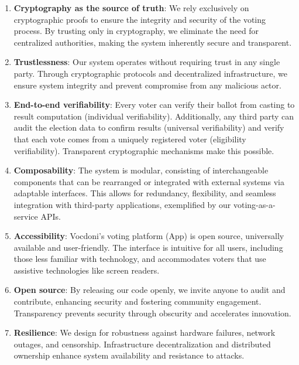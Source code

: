 \begin{enumerate}
	\item \textbf{Cryptography as the source of truth}: We rely exclusively on cryptographic proofs to ensure the integrity and security of the voting process. By trusting only in cryptography, we eliminate the need for centralized authorities, making the system inherently secure and transparent.
	
	\item \textbf{Trustlessness}: Our system operates without requiring trust in any single party. Through cryptographic protocols and decentralized infrastructure, we ensure system integrity and prevent compromise from any malicious actor.
	
	\item \textbf{End-to-end verifiability}: Every voter can verify their ballot from casting to result computation (individual verifiability). Additionally, any third party can audit the election data to confirm results (universal verifiability) and verify that each vote comes from a uniquely registered voter (eligibility verifiability). Transparent cryptographic mechanisms make this possible.
	
	\item \textbf{Composability}: The system is modular, consisting of interchangeable components that can be rearranged or integrated with external systems via adaptable interfaces. This allows for redundancy, flexibility, and seamless integration with third-party applications, exemplified by our voting-as-a-service APIs.
	
	\item \textbf{Accessibility}: Vocdoni’s voting platform (App) is open source, universally available and user-friendly. The interface is intuitive for all users, including those less familiar with technology, and accommodates voters that use assistive technologies like screen readers.
	
	\item \textbf{Open source}: By releasing our code openly, we invite anyone to audit and contribute, enhancing security and fostering community engagement. Transparency prevents security through obscurity and accelerates innovation.
	
	\item \textbf{Resilience}: We design for robustness against hardware failures, network outages, and censorship. Infrastructure decentralization and distributed ownership enhance system availability and resistance to attacks.
	

\end{enumerate}
